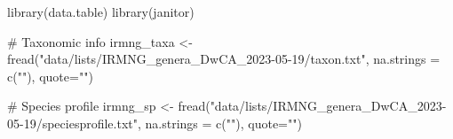 \documentclass[
  letterpaper,
  DIV=11,
  numbers=noendperiod,
  oneside]{scrreprt}
\newenvironment{Shaded}{\begin{snugshade}}{\end{snugshade}}
\newcommand{\AttributeTok}[1]{\textcolor[rgb]{0.40,0.45,0.13}{#1}}
\newcommand{\CommentTok}[1]{\textcolor[rgb]{0.37,0.37,0.37}{#1}}
\newcommand{\FunctionTok}[1]{\textcolor[rgb]{0.28,0.35,0.67}{#1}}
\newcommand{\NormalTok}[1]{\textcolor[rgb]{0.00,0.23,0.31}{#1}}
\newcommand{\OtherTok}[1]{\textcolor[rgb]{0.00,0.23,0.31}{#1}}
\newcommand{\StringTok}[1]{\textcolor[rgb]{0.13,0.47,0.30}{#1}}
\begin{document}
\begin{Shaded}
\begin{Highlighting}[]
\FunctionTok{library}\NormalTok{(data.table)}
\FunctionTok{library}\NormalTok{(janitor)}

\CommentTok{\# Taxonomic info}
\NormalTok{irmng\_taxa }\OtherTok{\textless{}{-}} \FunctionTok{fread}\NormalTok{(}\StringTok{"data/lists/IRMNG\_genera\_DwCA\_2023{-}05{-}19/taxon.txt"}\NormalTok{, }\AttributeTok{na.strings =} \FunctionTok{c}\NormalTok{(}\StringTok{""}\NormalTok{), }\AttributeTok{quote=}\StringTok{""}\NormalTok{)}

\CommentTok{\# Species profile}
\NormalTok{irmng\_sp }\OtherTok{\textless{}{-}} \FunctionTok{fread}\NormalTok{(}\StringTok{"data/lists/IRMNG\_genera\_DwCA\_2023{-}05{-}19/speciesprofile.txt"}\NormalTok{, }\AttributeTok{na.strings =} \FunctionTok{c}\NormalTok{(}\StringTok{""}\NormalTok{), }\AttributeTok{quote=}\StringTok{""}\NormalTok{)}
\end{Highlighting}
\end{Shaded}
\end{document}
